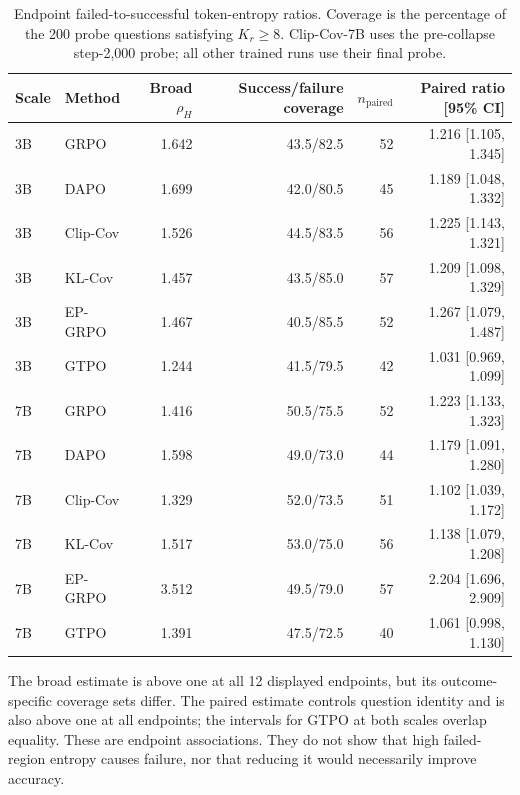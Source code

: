 \documentclass[letterpaper]{article}
\begin{document}
\begin{table}[t]
\centering
\scriptsize
\setlength{\tabcolsep}{3.2pt}
\begin{tabular*}{\textwidth}{@{\extracolsep{\fill}}llrrrr}
\toprule
Scale & Method & Broad \(\rho_H\) & Success/failure coverage &
\(n_{\mathrm{paired}}\) & Paired ratio [95\% CI]\\
\midrule
3B & GRPO     & 1.642 & 43.5/82.5 & 52 & 1.216 [1.105, 1.345]\\
3B & DAPO     & 1.699 & 42.0/80.5 & 45 & 1.189 [1.048, 1.332]\\
3B & Clip-Cov & 1.526 & 44.5/83.5 & 56 & 1.225 [1.143, 1.321]\\
3B & KL-Cov   & 1.457 & 43.5/85.0 & 57 & 1.209 [1.098, 1.329]\\
3B & EP-GRPO  & 1.467 & 40.5/85.5 & 52 & 1.267 [1.079, 1.487]\\
3B & GTPO     & 1.244 & 41.5/79.5 & 42 & 1.031 [0.969, 1.099]\\
\midrule
7B & GRPO     & 1.416 & 50.5/75.5 & 52 & 1.223 [1.133, 1.323]\\
7B & DAPO     & 1.598 & 49.0/73.0 & 44 & 1.179 [1.091, 1.280]\\
7B & Clip-Cov & 1.329 & 52.0/73.5 & 51 & 1.102 [1.039, 1.172]\\
7B & KL-Cov   & 1.517 & 53.0/75.0 & 56 & 1.138 [1.079, 1.208]\\
7B & EP-GRPO  & 3.512 & 49.5/79.0 & 57 & 2.204 [1.696, 2.909]\\
7B & GTPO     & 1.391 & 47.5/72.5 & 40 & 1.061 [0.998, 1.130]\\
\bottomrule
\end{tabular*}
\caption{Endpoint failed-to-successful token-entropy ratios.  Coverage is the
percentage of the 200 probe questions satisfying \(K_r\geq8\).  Clip-Cov-7B
uses the pre-collapse step-2,000 probe; all other trained runs use their final
probe.}
\label{tab:sup-reward-entropy}
\end{table}

The broad estimate is above one at all 12 displayed endpoints, but its
outcome-specific coverage sets differ.  The paired estimate controls question
identity and is also above one at all endpoints; the intervals for GTPO at
both scales overlap equality.  These are endpoint associations.  They do not
show that high failed-region entropy causes failure, nor that reducing it
would necessarily improve accuracy.
\end{document}
